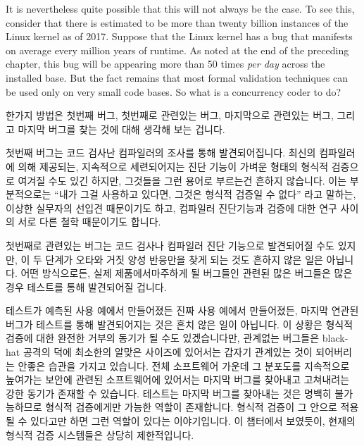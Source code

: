 It is nevertheless quite possible that this will not always be the case.
To see this, consider that there is estimated to be more than twenty
billion instances of the Linux kernel as of 2017.
Suppose that the Linux kernel has a bug that manifests on average every million
years of runtime.
As noted at the end of the preceding chapter, this bug will be appearing
more than 50 times \emph{per day} across the installed base.
But the fact remains that most formal validation techniques can be used
only on very small code bases.
So what is a concurrency coder to do?
\fi

한가지 방법은 첫번째 버그, 첫번째로 관련있는 버그, 마지막으로 관련있는 버그,
그리고 마지막 버그를 찾는 것에 대해 생각해 보는 겁니다.

첫번째 버그는 코드 검사난 컴파일러의 조사를 통해 발견되어집니다.
최신의 컴파일러에 의해 제공되는, 지속적으로 세련되어지는 진단 기능이 가벼운
형태의 형식적 검증으로 여겨질 수도 있긴 하지만, 그것들을 그런 용어로 부르는건
흔하지 않습니다.
이는 부분적으로는 ``내가 그걸 사용하고 있다면, 그것은 형식적 검증일 수 없다''
라고 말하는, 이상한 실무자의 선입견 때문이기도 하고, 컴파일러 진단기능과 검증에
대한 연구 사이의 서로 다른 철학 때문이기도 합니다.
\iffalse

One approach is to think in terms of finding the first bug, the first
relevant bug, the last relevant bug, and the last bug.

The first bug is normally found via inspection or compiler diagnostics.
Although the increasingly sophisticated diagnostics provided by modern
compilers might be considered to be a lightweight sort of formal
verification, it is not common to think of them in those terms.
This is in part due to an odd practitioner prejudice which says
``If I am using it, it cannot be formal verification'' on the one
hand, and the large difference in sophistication between compiler
diagnostics and verification research on the other.
\fi

첫번째로 관련있는 버그는 코드 검사나 컴파일러 진단 기능으로 발견되어질 수도
있지만, 이 두 단계가 오타와 거짓 양성 반응만을 찾게 되는 것도 흔하지 않은 일은
아닙니다.
어떤 방식으로든, 실제 제품에서마주하게 될 버그들인 관련된 많은 버그들은 많은
경우 테스트를 통해 발견되어질 겁니다.

테스트가 예측된 사용 예에서 만들어졌든 진짜 사용 예에서 만들어졌든, 마지막
연관된 버그가 테스트를 통해 발견되어지는 것은 흔치 않은 일이 아닙니다.
이 상황은 형식적 검증에 대한 완전한 거부의 동기가 될 수도 있겠습니다만,
관계없는 버그들은 black-hat 공격의 덕에 최소한의 알맞은 사이즈에 있어서는
갑자기 관계있는 것이 되어버리는 안좋은 습관을 가지고 있습니다.
전체 소프트웨어 가운데 그 분포도를 지속적으로 높여가는 보안에 관련된
소프트웨어에 있어서는 마지막 버그를 찾아내고 고쳐내려는 강한 동기가 존재할 수
있습니다.
테스트는 마지막 버그를 찾아내는 것은 명백히 불가능하므로 형식적 검증에게만
가능한 역할이 존재합니다.
형식적 검증이 그 안으로 적용될 수 있다고만 하면 그런 역할이 있다는
이야기입니다.
이 챕터에서 보였듯이, 현재의 형식적 검증 시스템들은 상당히 제한적입니다.
\iffalse

